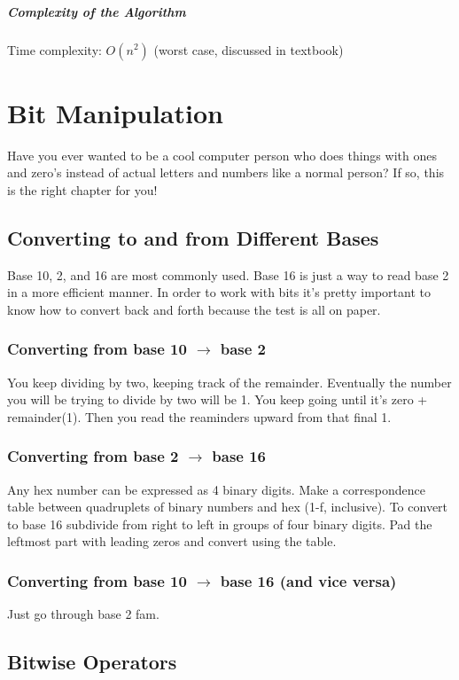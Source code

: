 \documentclass[a4paper,12pt]{report}
\begin{document}
\paragraph{Complexity of the Algorithm}
Time complexity: $O(n^2)$ (worst case, discussed in textbook)



\chapter{Bit Manipulation}
Have you ever wanted to be a cool computer person who does things with ones and zero's instead of actual letters and numbers like a normal person? If so, this is the right chapter for you!

\section{Converting to and from Different Bases}
Base 10, 2, and 16 are most commonly used. Base 16 is just a way to read base 2 in a more efficient manner. In order to work with bits it's pretty important to know how to convert back and forth because the test is all on paper. 

\subsection{Converting from base 10 $\to$ base 2}
You keep dividing by two, keeping track of the remainder. Eventually the number you will be trying to divide by two will be 1. You keep going until it's zero + remainder(1). Then you read the reaminders upward from that final 1.

\subsection{Converting from base 2 $\to$ base 16}
Any hex number can be expressed as 4 binary digits. Make a correspondence table between quadruplets of binary numbers and hex (1-f, inclusive). To convert to base 16 subdivide from right to left in groups of four binary digits. Pad the leftmost part with leading zeros and convert using the table. 

\subsection{Converting from base 10 $\to$ base 16 (and vice versa)}
Just go through base 2 fam.

\section{Bitwise Operators}
\end{document}
